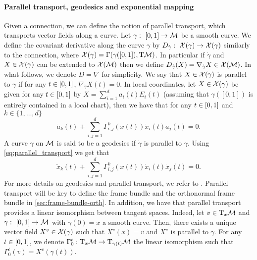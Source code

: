 \paragraph{Parallel transport, geodesics and exponential mapping} Given a
connection, we can define the notion of parallel transport, which transports
vector fields along a curve. Let $\gamma: \ \ccint{0,1} \to \M$ be a smooth
curve. We define the covariant derivative along the curve $\gamma$ by
$D_{\dot{\gamma}}: \ \mathcal{X}(\gamma) \to \mathcal{X}(\gamma)$ similarly to the connection, where
$\mathcal{X}(\gamma) = \Gamma(\gamma(\left[0,1\right]), \mathrm{T}\mathcal{M})$. In particular if $\dot{\gamma}$
and $X \in \mathcal{X}(\gamma)$ can be extended to $\mathcal{X}(\mathcal{M})$ then we define
$D_{\dot{\gamma}}(X) = \nabla_{\dot{\gamma}}X \in \mathcal{X}(\mathcal{M})$. In what follows, we
denote $D = \nabla$ for simplicity. We say that $X \in \mathcal{X}(\gamma)$ is parallel to
$\gamma$ if for any $t \in \left[0,1\right]$, $\nabla_{\dot{\gamma}}X(t) = 0$. In
local coordinates, let $X \in \mathcal{X}(\gamma)$ be given for any $t \in \left[0,1\right]$ by 
$X = \sum_{i=1}^d a_i(t) E_i(t)$ (assuming that $\gamma([0,1])$ is entirely
contained in a local chart), then we have that for any $t \in \left[0,1\right]$ and
$k \in \{1, \dots, d\}$
\begin{equation}
  \label{eq:parallel_transport}
  \textstyle{\dot{a}_k(t) + \sum_{i,j=1}^d \Gamma_{i,j}^k(x(t)) \dot{x}_i(t) a_j(t) = 0  .}
\end{equation}
A curve $\gamma$ on $\mathcal M$ is said to be a geodesics if $\dot{\gamma}$ is parallel
to $\gamma$. Using \cref{eq:parallel_transport} we get that
\begin{equation}
  \label{eq:geodesics}
  \textstyle{\ddot{x}_k(t) + \sum_{i,j=1}^d \Gamma_{i,j}^k(x(t)) \dot{x}_i(t) \dot{x}_j(t) = 0  .}
\end{equation}
For more details on geodesics and parallel transport, we refer to \citet[Chapter
4]{lee2018introduction}. Parallel transport will be key to define the frame
bundle and the orthonormal frame bundle in \cref{sec:frame-bundle-orth}. In
addition, we have that parallel transport provides a linear isomorphism between
tangent spaces. Indeed, let $v \in \mathrm{T}_x \mathcal M$ and
$\gamma: \ \ccint{0,1} \to \M$ with $\gamma(0) = x$ a smooth curve. Then, there
exists a unique vector field $X^v \in \mathcal{X}(\gamma)$ such that $X^v(x) = v$ and $X^v$ is
parallel to $\gamma$. For any $t \in \left[0,1\right]$, we denote
$\Gamma_0^t: \mathrm{T}_{x} \mathcal M \to \mathrm{T}_{\gamma(t)} \mathcal M$ the linear
isomorphism such that $\Gamma_0^t(v) = X^v(\gamma(t))$.

